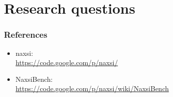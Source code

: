 \section{Research questions}


\begin{frame}[noframenumbering]
  \frametitle<presentation>{References}
  \begin{itemize}
   \item naxsi: \\ \url{https://code.google.com/p/naxsi/}
   \item NaxsiBench: \\ \url{https://code.google.com/p/naxsi/wiki/NaxsiBench}
  \end{itemize}
\end{frame}
